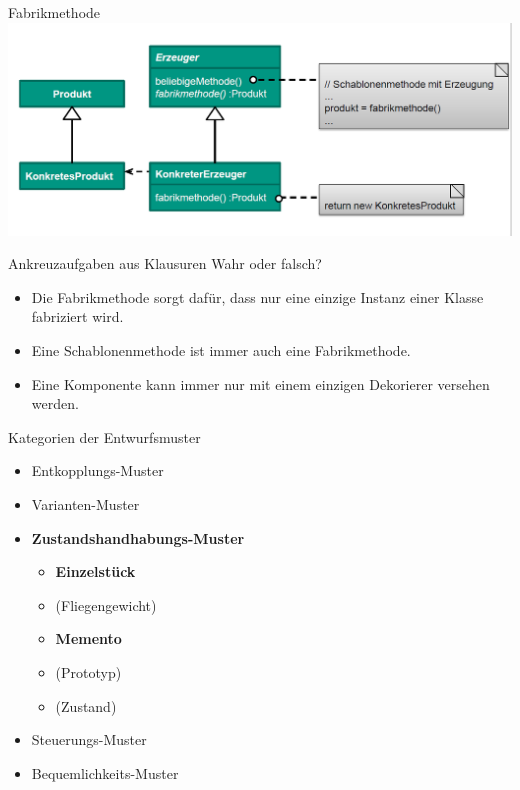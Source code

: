 \documentclass[18pt]{beamer}
\newcommand{\cmark}{\ding{51}}%
\newcommand{\xmark}{\ding{55}}%
\newcommand{\correct}{\textcolor{green}{\cmark}}
\newcommand{\ncorrect}{\textcolor{red}{\xmark}}
\begin{document}
	\begin{frame}{Fabrikmethode}
		\includegraphics[scale=0.4]{./pics/tut4/fab.png}
	\end{frame}

	\begin{frame}{Ankreuzaufgaben aus Klausuren}
	Wahr oder falsch?
		\begin{itemize}
			\item Die Fabrikmethode sorgt dafür, dass nur eine einzige Instanz einer Klasse fabriziert wird. \pause \ncorrect \pause 
			\item Eine Schablonenmethode ist immer auch eine Fabrikmethode. \pause \ncorrect \pause
			\item Eine Komponente kann immer nur mit einem einzigen Dekorierer versehen werden. \pause \ncorrect
		\end{itemize}
	\end{frame}

	\begin{frame}{Kategorien der Entwurfsmuster}
		\begin{itemize}
			\item Entkopplungs-Muster \correct
			\item Varianten-Muster \correct
			\item \textbf{Zustandshandhabungs-Muster}
				\begin{itemize}
					\item \textbf{Einzelstück}
					\item (Fliegengewicht)
					\item \textbf{Memento} 
					\item (Prototyp) 
					\item (Zustand)
				\end{itemize}
			\item Steuerungs-Muster
			\item Bequemlichkeits-Muster
		\end{itemize}
	\end{frame}
\end{document}
